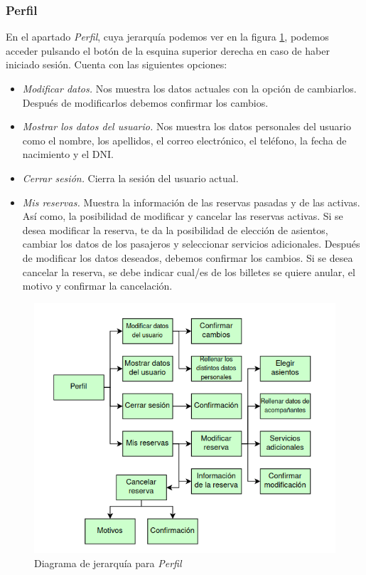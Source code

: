 \subsubsection*{Perfil}

En el apartado \textit{Perfil}, cuya jerarquía podemos ver en la figura \ref{fig:jerarquias2},
podemos acceder pulsando el botón de la esquina superior derecha en caso de haber iniciado sesión. Cuenta
con las siguientes opciones:

\begin{itemize}
      \item \textit{Modificar datos.} Nos muestra los datos actuales con la opción de cambiarlos. Después
            de modificarlos debemos confirmar los cambios.
      \item \textit{Mostrar los datos del usuario.} Nos muestra los datos personales del usuario como
            el nombre, los apellidos, el correo electrónico, el teléfono, la fecha de nacimiento
            y el DNI.
      \item \textit{Cerrar sesión.} Cierra la sesión del usuario actual.
      \item \textit{Mis reservas.} Muestra la información de las reservas pasadas y de las activas. Así
            como, la posibilidad de modificar y cancelar las reservas activas. Si se desea
            modificar la reserva, te da la posibilidad de elección de asientos, cambiar los datos
            de los pasajeros y seleccionar servicios adicionales. Después de modificar los datos
            deseados, debemos confirmar los cambios. Si se desea cancelar la reserva, se debe
            indicar cual/es de los billetes se quiere anular, el motivo y confirmar la cancelación.
\end{itemize}

\begin{figure}
      \centering
      \includegraphics[width=0.8\linewidth]{./Imagenes/jerarquia-perfil.png}
      \caption{Diagrama de jerarquía para \textit{Perfil}}
      \label{fig:jerarquias2}
\end{figure}

